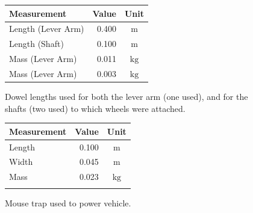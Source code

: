 \documentclass[a4paper]{article}
\begin{document}
\begin{figure}[h]
	\centering
	\begin{minipage}[t]{0.45\textwidth}
		\centering
		\begin{tabular}{p{3.5cm}rc}
			\toprule
			Measurement & Value & Unit \\
			\midrule
			Length (Lever Arm) & 0.400 & $\si{\meter}$ \\
			Length (Shaft) & 0.100 & $\si{\meter}$ \\
			Mass (Lever Arm) & 0.011 & $\si{\si{\kilogram}}$ \\
			Mass (Lever Arm) & 0.003 & $\si{\si{\kilogram}}$ \\
			\bottomrule
		\end{tabular}
		
		\vspace{0.5cm}
		
		\caption{Dowel lengths used for both the lever arm (one used), and for the shafts (two used) to which wheels were attached.}
	\end{minipage}
	\hspace{1cm}
	\begin{minipage}[t]{0.45\textwidth}
		\centering
		\begin{tabular}{p{3.5cm}rc}
			\toprule
			Measurement & Value & Unit \\
			\midrule
			Length & 0.100 & $\si{\meter}$ \\
			Width & 0.045 & $\si{\meter}$ \\
			Mass & 0.023 & $\si{\kilogram}$ \\
			 & & \\
			\bottomrule
		\end{tabular}
		
		\vspace{0.5cm}
		
		\caption{Mouse trap used to power vehicle.}
	\end{minipage}
\end{figure}
\end{document}
